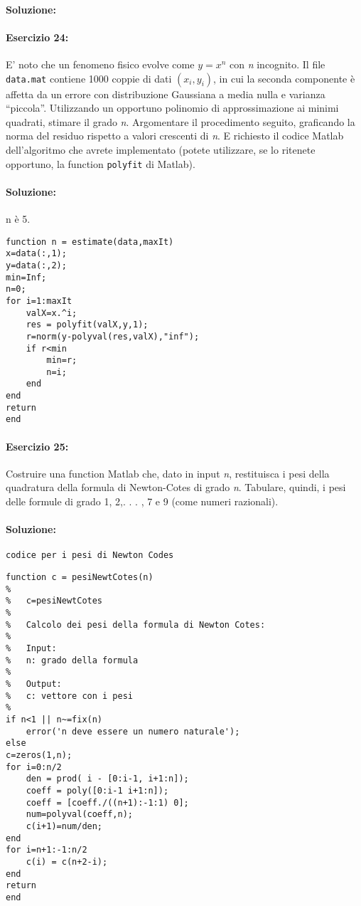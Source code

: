 \documentclass[12pt]{article}
\begin{document}
\paragraph{Soluzione:}


\paragraph{Esercizio 24:}
E' noto che un fenomeno fisico evolve come \(y = x^{n}\) con \emph{n} incognito. 
Il file \texttt{data.mat} contiene 1000 coppie di dati \((x_{i},y_{i})\), in cui la seconda componente è affetta da un errore con distribuzione Gaussiana a media nulla e varianza “piccola”. Utilizzando un opportuno polinomio
di approssimazione ai minimi quadrati, stimare il grado \emph{n}. Argomentare il procedimento seguito,
graficando la norma del residuo rispetto a valori crescenti di \emph{n}. E richiesto il codice Matlab dell'algoritmo 
che avrete implementato (potete utilizzare, se lo ritenete opportuno, la function \texttt{polyfit}
di Matlab).
\paragraph{Soluzione:}
n è 5.
\begin{lstlisting}[frame=single]
function n = estimate(data,maxIt)
x=data(:,1);
y=data(:,2);
min=Inf;
n=0;
for i=1:maxIt
    valX=x.^i;
    res = polyfit(valX,y,1);
    r=norm(y-polyval(res,valX),"inf");
    if r<min
        min=r;
        n=i;
    end
end
return
end
\end{lstlisting}

\paragraph{Esercizio 25:}
Costruire una function Matlab che, dato in input \emph{n}, restituisca i pesi della quadratura della formula di Newton-Cotes di grado \emph{n}. Tabulare, quindi, i pesi delle formule di grado
1, 2,. . . , 7 e 9 (come numeri razionali).


\paragraph{Soluzione:}

\texttt{codice per i pesi di Newton Codes}
\begin{lstlisting}[frame=single]
function c = pesiNewtCotes(n)
%
%   c=pesiNewtCotes
%
%   Calcolo dei pesi della formula di Newton Cotes:
%
%   Input:
%   n: grado della formula
%
%   Output:
%   c: vettore con i pesi
%
if n<1 || n~=fix(n)
    error('n deve essere un numero naturale');
else
c=zeros(1,n);
for i=0:n/2
    den = prod( i - [0:i-1, i+1:n]);
    coeff = poly([0:i-1 i+1:n]);
    coeff = [coeff./((n+1):-1:1) 0];
    num=polyval(coeff,n);
    c(i+1)=num/den;
end
for i=n+1:-1:n/2
    c(i) = c(n+2-i);
end
return
end
\end{lstlisting}
\end{document}
